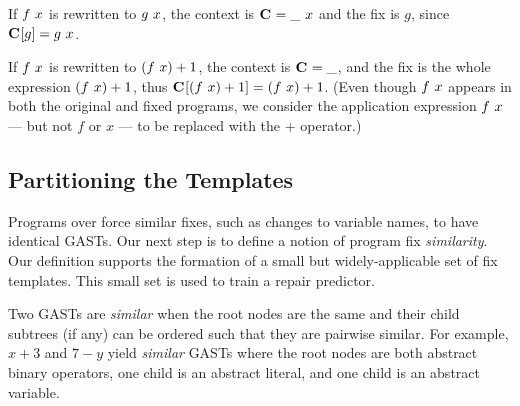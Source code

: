  If $f\ x$ is rewritten to $g\ x$, the context is
$\mathbf{C}_{} = \_\ x$ and the fix is $g$, since $\mathbf{C}_{}[g] = g\ x$.

If $f\ x$ is rewritten to $(f\ x) + 1$, the context is
$\mathbf{C}_{} = \_$, and the fix is the whole expression
$(f\ x) + 1$, thus $\mathbf{C}_{}[(f\ x) + 1] =
(f\ x) + 1$. (Even though $f\ x$ appears in
both the original and fixed programs, we consider the application expression
$f\ x$ --- but not $f$ or $x$ --- to be replaced with the $+$ operator.)

\subsection{Partitioning the Templates}

Programs over \lang force similar fixes, such as changes to variable names, to
have identical GASTs. Our next step is to define a notion of program fix
\emph{similarity}. Our definition supports the formation of a small but
widely-applicable set of fix templates. This small set is used to train a repair
predictor.

\label{subsec:partitioning}



Two GASTs are \emph{similar} when
the root nodes are the same and their child subtrees (if any) can be ordered
such that they are pairwise similar. For example, $x + 3$ and $7 - y$ yield
\emph{similar} GASTs where the root nodes are both abstract binary operators,
one child is an abstract literal, and one child is an abstract variable.

